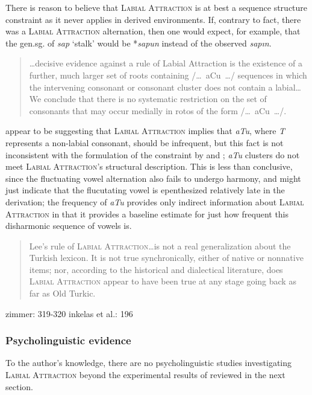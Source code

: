 There is reason to believe that \textsc{Labial Attraction} is at best a sequence structure constraint as it never applies in derived environments. If, contrary to fact, there was a \textsc{Labial Attraction} alternation, then one would expect, for example, that the gen.sg. of \emph{sap} `stalk' would be *\emph{sapun} instead of the observed \emph{sapın}.

\citet{Lees1966a}
\citet{Zimmer1969}

\begin{quote}
\ldots decisive evidence against a rule of Labial Attraction is the existence of a further, much larger set of roots containing /\ldots~aCu~\ldots/ sequences in which the intervening consonant or consonant cluster does not contain a labial\ldots We conclude that there is no systematic restriction on the set of consonants that may occur medially in rotos of the form /\ldots~aCu~\ldots/. \citep[][225]{Clements1982}
\end{quote}

\noindent
\citeauthor{Clements1982} appear to be suggesting that \textsc{Labial Attraction} implies that \emph{aTu}, where \emph{T} represents a non-labial consonant, should be infrequent, but this fact is not inconsistent with the formulation of the constraint by \citet{Lees1966a,Lees1966b} and \citet{Zimmer1969}; \emph{aTu} clusters do not meet \textsc{Labial Attraction}'s structural description. This is less than conclusive, since the fluctuating vowel alternation also fails to undergo harmony, and might just indicate that the flucutating vowel is epenthesized relatively late in the derivation; the frequency of \emph{aTu} provides only indirect information about \textsc{Labial Attraction} in that it provides a baseline estimate for just how frequent this disharmonic sequence of vowels is.

\citet{Inkelas1997}
\citet{Inkelas2001}

\begin{quote}
Lee's rule of \textsc{Labial Attraction}\ldots is not a real generalization about the Turkish lexicon. It is not true synchronically, either of native or nonnative items; nor, according to the historical and dialectical literature, does \textsc{Labial Attraction} appear to have been true at any stage going back as far as Old Turkic. \citep[][196]{Inkelas2001}
\end{quote}

zimmer: 319-320 
inkelas et al.: 196

\subsubsection{Psycholinguistic evidence}

To the author's knowledge, there are no psycholinguistic studies investigating \textsc{Labial Attraction} beyond the experimental results of \citet{Zimmer1969} reviewed in the next section. 
